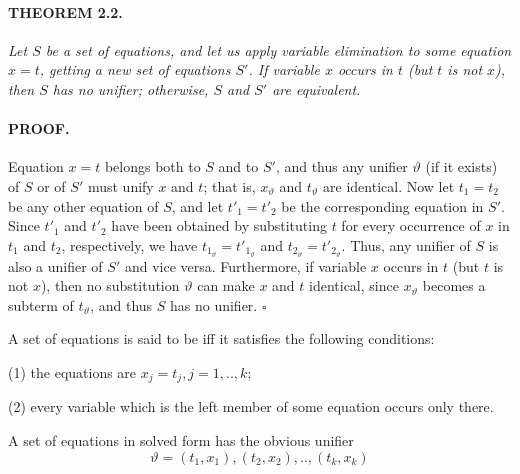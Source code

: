 \paragraph{THEOREM 2.2.} \textit{Let $S$ be a set of equations, and let us apply
variable elimination to some equation $x = t$, getting a new set of equations
$S'$. If variable $x$ occurs in $t$ (but $t$ is not $x$), then $S$ has no
unifier; otherwise, $S$ and $S'$ are equivalent.}

\paragraph{PROOF.} Equation $x = t$ belongs both to $S$ and to $S'$, and thus
any unifier $\vartheta$ (if it exists) of $S$ or of $S'$ must unify $x$ and $t$;
that is, $x_\vartheta$ and $t_\vartheta$ are identical. Now let $t_1 = t_2$ be
any other equation of $S$, and let $t'_1 = t'_2$ be the corresponding equation
in $S'$. Since $t'_1$ and $t'_2$ have been obtained by substituting $t$ for
every occurrence of $x$ in $t_1$ and $t_2$, respectively, we have
$t_{1_\vartheta}=t'_{1_\vartheta}$ and $t_{2_\vartheta}=t'_{2_\vartheta}$. Thus,
any unifier of $S$ is also a unifier of $S'$ and vice versa. Furthermore, if
variable $x$ occurs in $t$ (but $t$ is not $x$), then no substitution
$\vartheta$ can make $x$ and $t$ identical, since $x_\vartheta$ becomes a
subterm of $t_\vartheta$, and thus $S$ has no unifier. $\square$

A set of equations is said to be  iff it satisfies the
following conditions: 

(1) the equations are $x_j = t_j, j = 1,..,k$;

(2) every variable which is the left member of some equation occurs only there.

A set of equations in solved form has the obvious unifier
\[\vartheta = {(t_1,x_1),(t_2,x_2),..,(t_k,x_k)}\]

 
  